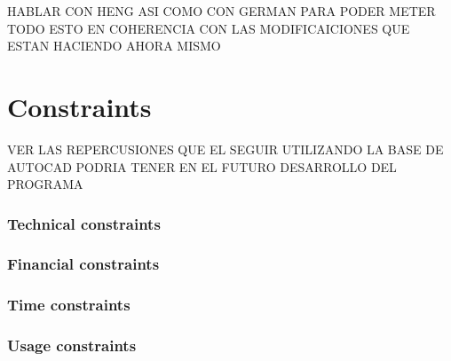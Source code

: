 HABLAR CON HENG ASI COMO CON GERMAN PARA PODER METER TODO ESTO EN COHERENCIA CON LAS MODIFICAICIONES QUE ESTAN HACIENDO AHORA MISMO 

\section{Constraints}

VER LAS REPERCUSIONES QUE EL SEGUIR UTILIZANDO LA BASE DE AUTOCAD PODRIA TENER EN EL FUTURO DESARROLLO DEL PROGRAMA

\subsubsection{Technical constraints}
\subsubsection{Financial constraints}
\subsubsection{Time constraints}
\subsubsection{Usage constraints}

